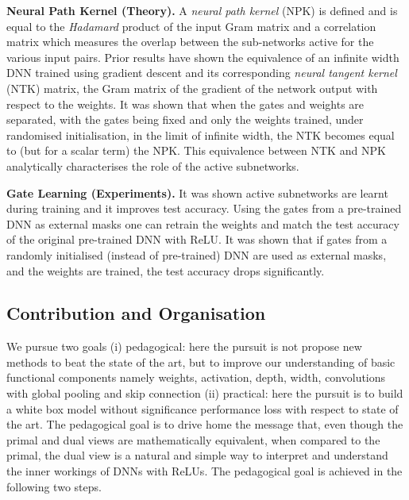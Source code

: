 \documentclass{article} %
\begin{document}
\textbf{Neural Path Kernel (Theory).} A \emph{neural path kernel} (NPK) is defined and is equal to the \emph{Hadamard} product of the input Gram matrix and a correlation matrix which measures the overlap between the sub-networks active for the various input pairs. Prior results  \cite{arora2019exact,cao2019generalization,ntk} have shown the equivalence of an infinite width DNN trained using gradient descent and its corresponding \emph{neural tangent kernel} (NTK) matrix, the Gram matrix of the gradient of the network output with respect to the weights. It was shown that when the gates and weights are separated, with the gates being fixed and only the weights trained, under randomised initialisation, in the limit of infinite width, the NTK becomes equal to (but for a scalar term) the NPK. This equivalence between NTK and NPK analytically characterises the role of the active subnetworks.


\textbf{Gate Learning (Experiments).}  It was shown active subnetworks are learnt during training and it improves test accuracy.  Using the gates from a pre-trained DNN as external masks one can retrain the weights and match the test accuracy of the original pre-trained DNN with ReLU. 
It was shown that if gates from a randomly initialised (instead of pre-trained) DNN are used as external masks, and the weights are trained, the test accuracy drops significantly. 

\subsection{Contribution and Organisation}
 
We pursue two goals (i) pedagogical: here the pursuit is not propose new methods to beat the state of the art, but to improve our understanding of basic functional components namely weights, activation, depth, width, convolutions with global pooling  and skip connection (ii) practical: here the pursuit is to build a white box model without significance performance loss with respect to state of the art. The pedagogical goal is to drive home the message that, even though the primal and dual views are mathematically equivalent, when compared to the primal, the dual view is a natural and simple way to interpret and understand the inner workings of DNNs with ReLUs. The pedagogical goal is achieved in the following two steps. 
\end{document}
